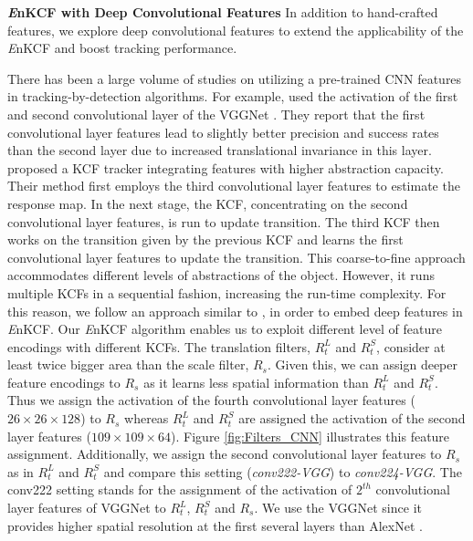 \documentclass[10pt,twocolumn,letterpaper]{article}
\begin{document}
\textbf{{\it E}nKCF with Deep Convolutional Features} In addition to
hand-crafted features, we explore deep convolutional features to
extend the applicability of the {\it E}nKCF and boost tracking
performance.

There has been a large volume of studies on utilizing a pre-trained
CNN features in tracking-by-detection algorithms. For example,
\cite{danelljan2015convolutional} used the activation of the first
and second convolutional layer of the VGGNet \cite{simonyan2014very}.
They report that the first convolutional layer features lead to
slightly better precision and success rates than the second layer due
to increased translational invariance in this
layer. \cite{ma2015hierarchical} proposed a KCF tracker integrating
features with higher abstraction capacity.  Their method first employs
the third convolutional layer features to estimate the response
map. In the next stage, the KCF, concentrating on the second
convolutional layer features, is run to update transition. The third
KCF then works on the transition given by the previous KCF and learns
the first convolutional layer features to update the transition. This
coarse-to-fine approach accommodates different levels of abstractions
of the object. However, it runs multiple KCFs in a sequential fashion,
increasing the run-time complexity. For this reason, we follow an
approach similar to \cite{danelljan2015convolutional}, in order to
embed deep features in {\it E}nKCF. Our {\it E}nKCF algorithm enables
us to exploit different level of feature encodings with different
KCFs. The translation filters, $R_{t}^{L}$ and $R_{t}^{S}$, consider
at least twice bigger area than the scale filter, $R_{s}$. Given this,
we can assign deeper feature encodings to $R_{s}$ as it learns less
spatial information than $R_{t}^{L}$ and $R_{t}^{S}$. Thus we assign
the activation of the fourth convolutional layer features
($26\times26\times128$) to $R_{s}$ whereas $R_{t}^{L}$ and $R_{t}^{S}$
are assigned the activation of the second layer features
($109\times109\times64$). Figure \ref{fig:Filters_CNN} illustrates
this feature assignment. Additionally, we assign the second
convolutional layer features to $R_{s}$ as in $R_{t}^{L}$ and
$R_{t}^{S}$ and compare this setting (\textit{conv222-VGG}) to
\textit{conv224-VGG}. The conv222 setting stands for the assignment of
the activation of $2^{th}$ convolutional layer features of VGGNet to
$R_{t}^{L}$, $R_{t}^{S}$ and $R_{s}$. We use the VGGNet since it
provides higher spatial resolution at the first several layers than
AlexNet \cite{krizhevsky2012imagenet}.
\end{document}
